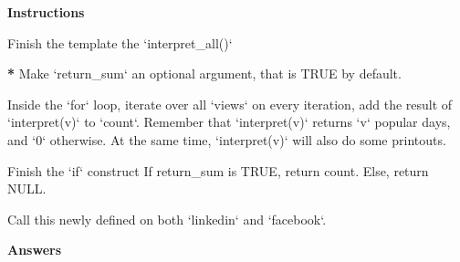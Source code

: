\documentclass[]{article}
\newcommand{\hlstr}[1]{\textcolor[rgb]{0.251,0.627,0.251}{#1}}%
\newcommand{\hlstd}[1]{\textcolor[rgb]{0.251,0.251,0.251}{#1}}%
\newcommand{\hlkwc}[1]{\textcolor[rgb]{0.251,0.251,0.251}{#1}}%
\newenvironment{Shaded}{\begin{myshaded}}{\end{myshaded}}
\newcommand{\DataTypeTok}[1]{\hlkwc{#1}}
\newcommand{\StringTok}[1]{\hlstr{#1}}
\newcommand{\OtherTok}[1]{{#1}}
\newcommand{\ErrorTok}[1]{\textbf{{#1}}}
\newcommand{\NormalTok}[1]{\hlstd{#1}}
\begin{document}
\textbf{Instructions}

\begin{Shaded}
\begin{Highlighting}[]

\NormalTok{Finish the template }\NormalTok{ the }\StringTok{`}\DataTypeTok{interpret_all()}\StringTok{`} \OperatorTok{:}

\ErrorTok{*}\StringTok{ }\NormalTok{Make }\StringTok{`}\DataTypeTok{return_sum}\StringTok{`}\NormalTok{ an optional argument, that is }\OtherTok{TRUE}\NormalTok{ by default.}

\OperatorTok{*}\StringTok{ }\NormalTok{Inside the }\StringTok{`}\DataTypeTok{for}\StringTok{`}\NormalTok{ loop, iterate over all }\StringTok{`}\DataTypeTok{views}\StringTok{`}\OperatorTok{:}\StringTok{ }\NormalTok{on every iteration, add the result of }\StringTok{`}\DataTypeTok{interpret(v)}\StringTok{`}\NormalTok{ to }\StringTok{`}\DataTypeTok{count}\StringTok{`}\NormalTok{. Remember that }\StringTok{`}\DataTypeTok{interpret(v)}\StringTok{`}\NormalTok{ returns }\StringTok{`}\DataTypeTok{v}\StringTok{`} \NormalTok{ popular days, and }\StringTok{`}\DataTypeTok{0}\StringTok{`}\NormalTok{ otherwise. At the same time, }\StringTok{`}\DataTypeTok{interpret(v)}\StringTok{`}\NormalTok{ will also do some printouts.}

\OperatorTok{*}\StringTok{ }\NormalTok{Finish the }\StringTok{`}\DataTypeTok{if}\StringTok{`}\NormalTok{ construct}\OperatorTok{:}
\OperatorTok{+}\StringTok{ }\NormalTok{If return_sum is }\OtherTok{TRUE}\NormalTok{, return count.}
\OperatorTok{+}\StringTok{ }\NormalTok{Else, return NULL.}

\NormalTok{Call this newly defined }\NormalTok{ on both }\StringTok{`}\DataTypeTok{linkedin}\StringTok{`}\NormalTok{ and }\StringTok{`}\DataTypeTok{facebook}\StringTok{`}\NormalTok{.}
\end{Highlighting}
\end{Shaded}

\textbf{Answers}
\end{document}
